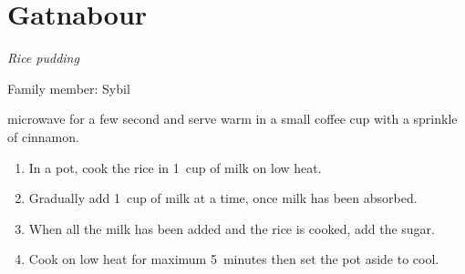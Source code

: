 \chapter{Gatnabour}
\label{ch:gatnabour}


\textit{Rice pudding}

Family member: Sybil

 microwave for a few second and serve warm in a small coffee cup with a sprinkle of cinnamon.


\begin{enumerate}
    \item In a pot, cook the rice in 1~cup of milk on low heat.
    \item Gradually add 1~cup of milk at a time, once milk has been absorbed.
    \item When all the milk has been added and the rice is cooked, add the sugar.
    \item Cook on low heat for maximum 5~minutes then set the pot aside to cool.
\end{enumerate}
